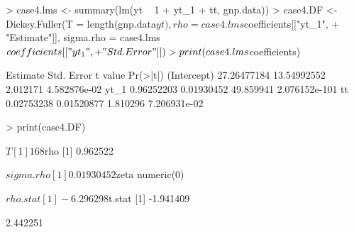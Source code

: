\begin{Schunk}
\begin{Sinput}
> case4.lms <- summary(lm(yt ~ 1 + yt_1 + tt, gnp.data))
> case4.DF <- Dickey.Fuller(T = length(gnp.data$yt), rho = case4.lms$coefficients[["yt_1", 
+     "Estimate"]], sigma.rho = case4.lms$coefficients[["yt_1", 
+     "Std. Error"]])
> print(case4.lms$coefficients)
\end{Sinput}
\begin{Soutput}
               Estimate  Std. Error   t value      Pr(>|t|)
(Intercept) 27.26477184 13.54992552  2.012171  4.582876e-02
yt_1         0.96252203  0.01930452 49.859941 2.076152e-101
tt           0.02753238  0.01520877  1.810296  7.206931e-02
\end{Soutput}
\begin{Sinput}
> print(case4.DF)
\end{Sinput}
\begin{Soutput}
$T
[1] 168

$rho
[1] 0.962522

$sigma.rho
[1] 0.01930452

$zeta
numeric(0)

$rho.stat
[1] -6.296298

$t.stat
[1] -1.941409
\end{Soutput}
\begin{Soutput}
[1] 2.442251
\end{Soutput}
\end{Schunk}

